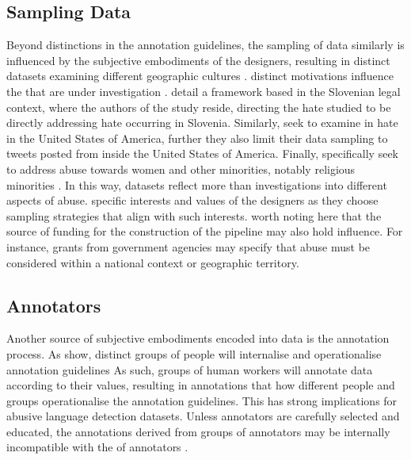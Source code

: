 \subsection{Sampling Data}
Beyond distinctions in the annotation guidelines, the sampling of data similarly is influenced by the subjective embodiments of the designers, resulting in distinct datasets examining different geographic cultures \citep{Waseem:2018}.
 distinct motivations  influence the  that are under investigation \citep{Waseem:2018}.
 \citet{Fiser:2017} detail a framework based in the Slovenian legal context, where the authors of the study reside, directing the hate studied to be directly addressing hate occurring in Slovenia.
Similarly, \citet{Davidson:2017} seek to examine in hate in the United States of America, further they also limit their data sampling to tweets posted from inside the United States of America.
Finally, \citet{Waseem-Hovy:2016} specifically seek to address abuse towards women and other minorities, notably religious minorities .
In this way, datasets reflect more than investigations into different aspects of abuse.
 specific interests and values of the designers as they choose sampling strategies that align with such interests.
 worth noting here that the source of funding for the construction of the pipeline may also hold influence.
For instance, grants from government agencies may specify that abuse must be considered within a national context or geographic territory.

\subsection{Annotators}
Another source of subjective embodiments  encoded into  data is  the annotation process\citep{Waseem:2016}.
As \citet{Waseem:2016} show, distinct groups of people will internalise and operationalise annotation guidelines 
As such, groups of human workers will annotate data according to their values, resulting in annotations that  how different people and groups  operationalise the annotation guidelines.
This has strong implications for abusive language detection datasets.
Unless annotators are carefully selected and educated, the annotations derived from  groups of annotators may be internally incompatible with the  of annotators .

